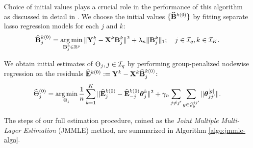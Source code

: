 Choice of initial values plays a crucial role in the performance of this algorithm as discussed in detail in
\citet{LinEtal16}. 
%
%
We choose the initial values $\{ \widehat {{\mathbf{B}}}^{k (0)} \}$ by fitting separate lasso regression models for each $j$ and $k$:
%
\begin{align}\label{eqn:init-B}
\widehat {{\mathbf{B}}}_j^{k (0)} = \operatorname*{arg\,min}_{{\mathbf{B}}_j^k \in {\mathbb{R}}^p} \|{\mathbf{Y}}_j^k - {\mathbf{X}}^k {\mathbf{B}}_j^k \|^2 + \lambda_n \| {\mathbf{B}}_j^k \|_1; \quad
j \in {\cal{I}}_q, k \in {\cal{I}}_K.
\end{align}
%

We obtain initial estimates of $ \Theta_j, j \in {\cal{I}}_q$ by performing group-penalized nodewise regression on the residuals $\widehat {{\mathbf{E}}}^{k (0)} := {\mathbf{Y}}^k - {\mathbf{X}}^k \widehat {{\mathbf{B}}}_j^{k (0)}$:
%
\begin{align}\label{eqn:init-Theta}
\widehat \Theta_j^{(0)} = \operatorname*{arg\,min}_{\Theta_j} \frac{1}{n} \sum_{k=1}^K \|
\widehat {{\mathbf{E}}}_j^{k (0)} - \widehat {{\mathbf{E}}}_{-j}^{k (0)} {\boldsymbol{\theta}}_j^k \|^2
+ \gamma_n \sum_{j \neq j'} \sum_{g \in {\cal{G}}_y^{jj'}} \| {\boldsymbol{\theta}}_{jj'}^{[g]} \|.
\end{align}

The steps of our full estimation procedure, coined as the {\it Joint Multiple Multi-Layer Estimation} (JMMLE) method, are summarized in Algorithm \ref{algo:jmmle-algo}.

